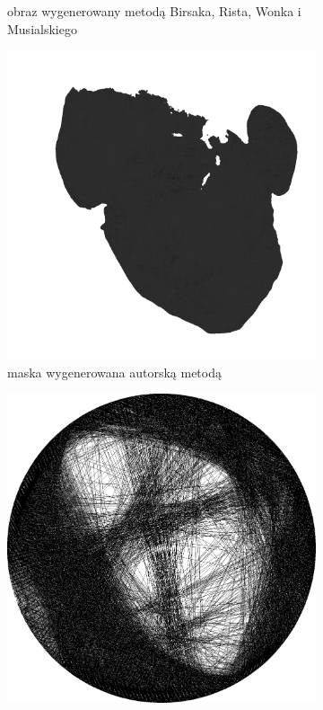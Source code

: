 \begin{figure}[H]
\begin{subfigure}{0.32\textwidth}
        \caption{obraz wygenerowany metodą Birsaka, Rista, Wonka i Musialskiego}
        \label{comp-comp-magdalene-c}
    \end{subfigure}
    \begin{subfigure}{0.24\textwidth}
        \centering
        \includegraphics[width = \textwidth]{img/6-comp/magdalene_mask_c20_inv0_bg1_obj10_ed1.png}
        \caption{maska wygenerowana autorską metodą}
        \label{comp-comp-magdalene-d}
    \end{subfigure}
    \begin{subfigure}{0.24\textwidth}
        \centering
        \includegraphics[width = \textwidth]{img/6-comp/magdalene_e_i3500_c20_inv0_bg1_obj10_ed1.png}

\end{subfigure}
\end{figure}
